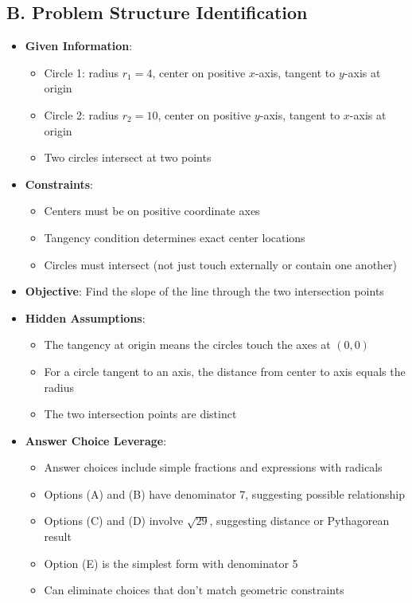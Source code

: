 \documentclass[12pt]{article}
\begin{document}
\begin{problemconfigbox}
\subsection*{B. Problem Structure Identification}
\begin{itemize}[leftmargin=*]
    \item \textbf{Given Information}: 
    \begin{itemize}
        \item Circle 1: radius $r_1 = 4$, center on positive $x$-axis, tangent to $y$-axis at origin
        \item Circle 2: radius $r_2 = 10$, center on positive $y$-axis, tangent to $x$-axis at origin
        \item Two circles intersect at two points
    \end{itemize}
    \item \textbf{Constraints}: 
    \begin{itemize}
        \item Centers must be on positive coordinate axes
        \item Tangency condition determines exact center locations
        \item Circles must intersect (not just touch externally or contain one another)
    \end{itemize}
    \item \textbf{Objective}: Find the slope of the line through the two intersection points
    \item \textbf{Hidden Assumptions}: 
    \begin{itemize}
        \item The tangency at origin means the circles touch the axes at $(0,0)$
        \item For a circle tangent to an axis, the distance from center to axis equals the radius
        \item The two intersection points are distinct
    \end{itemize}
    \item \textbf{Answer Choice Leverage}: 
    \begin{itemize}
        \item Answer choices include simple fractions and expressions with radicals
        \item Options (A) and (B) have denominator 7, suggesting possible relationship
        \item Options (C) and (D) involve $\sqrt{29}$, suggesting distance or Pythagorean result
        \item Option (E) is the simplest form with denominator 5
        \item Can eliminate choices that don't match geometric constraints
    \end{itemize}
\end{itemize}


\end{problemconfigbox}
\end{document}
